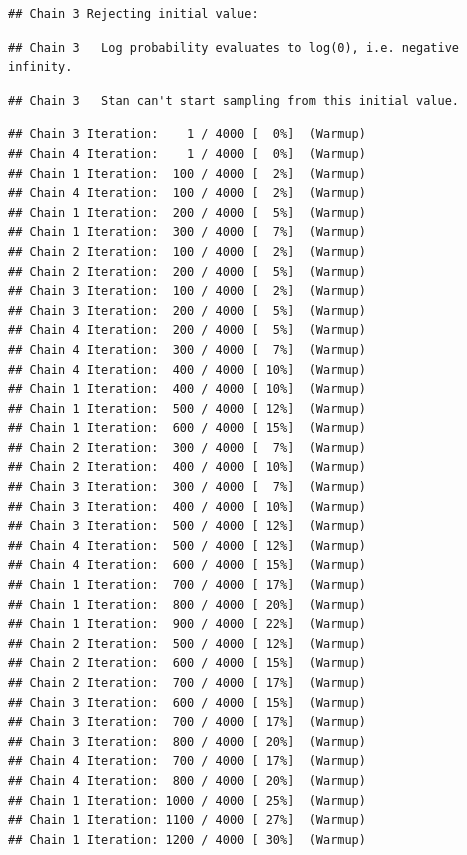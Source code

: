 \documentclass[
]{article}
\begin{document}
\begin{verbatim}
## Chain 3 Rejecting initial value:
\end{verbatim}

\begin{verbatim}
## Chain 3   Log probability evaluates to log(0), i.e. negative infinity.
\end{verbatim}

\begin{verbatim}
## Chain 3   Stan can't start sampling from this initial value.
\end{verbatim}

\begin{verbatim}
## Chain 3 Iteration:    1 / 4000 [  0%]  (Warmup) 
## Chain 4 Iteration:    1 / 4000 [  0%]  (Warmup) 
## Chain 1 Iteration:  100 / 4000 [  2%]  (Warmup) 
## Chain 4 Iteration:  100 / 4000 [  2%]  (Warmup) 
## Chain 1 Iteration:  200 / 4000 [  5%]  (Warmup) 
## Chain 1 Iteration:  300 / 4000 [  7%]  (Warmup) 
## Chain 2 Iteration:  100 / 4000 [  2%]  (Warmup) 
## Chain 2 Iteration:  200 / 4000 [  5%]  (Warmup) 
## Chain 3 Iteration:  100 / 4000 [  2%]  (Warmup) 
## Chain 3 Iteration:  200 / 4000 [  5%]  (Warmup) 
## Chain 4 Iteration:  200 / 4000 [  5%]  (Warmup) 
## Chain 4 Iteration:  300 / 4000 [  7%]  (Warmup) 
## Chain 4 Iteration:  400 / 4000 [ 10%]  (Warmup) 
## Chain 1 Iteration:  400 / 4000 [ 10%]  (Warmup) 
## Chain 1 Iteration:  500 / 4000 [ 12%]  (Warmup) 
## Chain 1 Iteration:  600 / 4000 [ 15%]  (Warmup) 
## Chain 2 Iteration:  300 / 4000 [  7%]  (Warmup) 
## Chain 2 Iteration:  400 / 4000 [ 10%]  (Warmup) 
## Chain 3 Iteration:  300 / 4000 [  7%]  (Warmup) 
## Chain 3 Iteration:  400 / 4000 [ 10%]  (Warmup) 
## Chain 3 Iteration:  500 / 4000 [ 12%]  (Warmup) 
## Chain 4 Iteration:  500 / 4000 [ 12%]  (Warmup) 
## Chain 4 Iteration:  600 / 4000 [ 15%]  (Warmup) 
## Chain 1 Iteration:  700 / 4000 [ 17%]  (Warmup) 
## Chain 1 Iteration:  800 / 4000 [ 20%]  (Warmup) 
## Chain 1 Iteration:  900 / 4000 [ 22%]  (Warmup) 
## Chain 2 Iteration:  500 / 4000 [ 12%]  (Warmup) 
## Chain 2 Iteration:  600 / 4000 [ 15%]  (Warmup) 
## Chain 2 Iteration:  700 / 4000 [ 17%]  (Warmup) 
## Chain 3 Iteration:  600 / 4000 [ 15%]  (Warmup) 
## Chain 3 Iteration:  700 / 4000 [ 17%]  (Warmup) 
## Chain 3 Iteration:  800 / 4000 [ 20%]  (Warmup) 
## Chain 4 Iteration:  700 / 4000 [ 17%]  (Warmup) 
## Chain 4 Iteration:  800 / 4000 [ 20%]  (Warmup) 
## Chain 1 Iteration: 1000 / 4000 [ 25%]  (Warmup) 
## Chain 1 Iteration: 1100 / 4000 [ 27%]  (Warmup) 
## Chain 1 Iteration: 1200 / 4000 [ 30%]  (Warmup) 

\end{verbatim}
\end{document}
